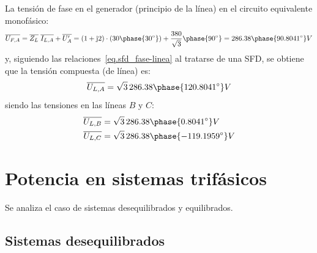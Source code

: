\begin{example}
		
		La tensión de fase en el generador (principio de la línea) en el circuito equivalente monofásico:
		\begin{equation*}
		    \overline{U_{F,A}}=\overline{Z_L}\;\overline{I_{L,A}}+ \overline{U_A'}=(1+\mathrm{j}2)\cdot(30\phase{30^\circ})+\dfrac{380}{\sqrt{3}}\phase{90^\circ}=286.38\phase{90.8041^\circ} V
		\end{equation*}
		y, siguiendo las relaciones~\eqref{eq.sfd_fase-linea} al tratarse de una SFD, se obtiene que la tensión compuesta (de línea) es: 
		\begin{equation*}
		    \overline{U_{L,A}}=\sqrt{3}\,286.38\phase{120.8041^\circ} V 
		\end{equation*}
		siendo las tensiones en las líneas $B$ y $C$:
		\begin{align*}
			  \overline{U_{L,B}}&=\sqrt{3}\,286.38\phase{0.8041^\circ} V\\
			  \overline{U_{L,C}}&=\sqrt{3}\,286.38\phase{-119.1959^\circ} V
			\end{align*}
		\end{example}
	
	\section{Potencia en sistemas trifásicos}\label{sec.potencia_trifasica}
	Se analiza el caso de sistemas desequilibrados y equilibrados.
	
	\subsection{Sistemas desequilibrados}
	
